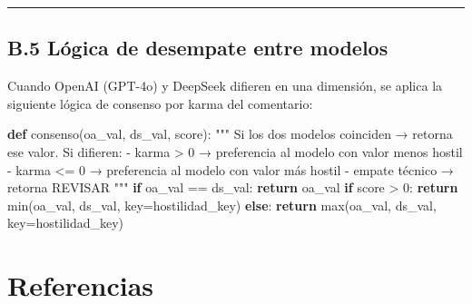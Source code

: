 \documentclass[
  letterpaper,
  numbers=noendperiod,
  fontsize=11pt,
  DIV=12,
  titlepage=false]{scrreprt}
\newenvironment{Shaded}{\begin{snugshade}}{\end{snugshade}}
\newcommand{\BuiltInTok}[1]{\textcolor[rgb]{0.00,0.23,0.31}{#1}}
\newcommand{\CommentTok}[1]{\textcolor[rgb]{0.37,0.37,0.37}{#1}}
\newcommand{\ControlFlowTok}[1]{\textcolor[rgb]{0.00,0.23,0.31}{\textbf{#1}}}
\newcommand{\DecValTok}[1]{\textcolor[rgb]{0.68,0.00,0.00}{#1}}
\newcommand{\KeywordTok}[1]{\textcolor[rgb]{0.00,0.23,0.31}{\textbf{#1}}}
\newcommand{\NormalTok}[1]{\textcolor[rgb]{0.00,0.23,0.31}{#1}}
\newcommand{\OperatorTok}[1]{\textcolor[rgb]{0.37,0.37,0.37}{#1}}
\begin{document}
\begin{center}\rule{0.5\linewidth}{0.5pt}\end{center}

\section{B.5 Lógica de desempate entre
modelos}\label{b.5-luxf3gica-de-desempate-entre-modelos}

Cuando OpenAI (GPT-4o) y DeepSeek difieren en una dimensión, se aplica
la siguiente lógica de consenso por karma del comentario:

\begin{Shaded}
\begin{Highlighting}[]
\KeywordTok{def}\NormalTok{ consenso(oa\_val, ds\_val, score):}
    \CommentTok{"""}
\CommentTok{    Si los dos modelos coinciden → retorna ese valor.}
\CommentTok{    Si difieren:}
\CommentTok{      {-} karma \textgreater{} 0  → preferencia al modelo con valor menos hostil}
\CommentTok{      {-} karma \textless{}= 0 → preferencia al modelo con valor más hostil}
\CommentTok{      {-} empate técnico → retorna \textquotesingle{}REVISAR\textquotesingle{}}
\CommentTok{    """}
    \ControlFlowTok{if}\NormalTok{ oa\_val }\OperatorTok{==}\NormalTok{ ds\_val:}
        \ControlFlowTok{return}\NormalTok{ oa\_val}
    \ControlFlowTok{if}\NormalTok{ score }\OperatorTok{\textgreater{}} \DecValTok{0}\NormalTok{:}
        \ControlFlowTok{return} \BuiltInTok{min}\NormalTok{(oa\_val, ds\_val, key}\OperatorTok{=}\NormalTok{hostilidad\_key)}
    \ControlFlowTok{else}\NormalTok{:}
        \ControlFlowTok{return} \BuiltInTok{max}\NormalTok{(oa\_val, ds\_val, key}\OperatorTok{=}\NormalTok{hostilidad\_key)}
\end{Highlighting}
\end{Shaded}

\clearpage


\chapter{Referencias}\label{referencias}
\end{document}
